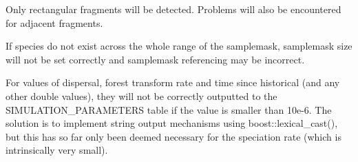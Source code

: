 
\begin{DoxyRefList}
\item[\label{bug__bug000002}%
\hypertarget{bug__bug000002}{}%
Member \hyperlink{class_community_ac9433a0c34911ec1128b5459f61488fc}{Community\+:\+:calc\+Fragments} (string fragment\+\_\+file)]Only rectangular fragments will be detected. Problems will also be encountered for adjacent fragments.  
\item[\label{bug__bug000001}%
\hypertarget{bug__bug000001}{}%
Member \hyperlink{class_community_a579c5f423fc2461838a80baf6b396310}{Community\+:\+:detect\+Dimensions} (string db)]If species do not exist across the whole range of the samplemask, samplemask size will not be set correctly and samplemask referencing may be incorrect.  
\item[\label{bug__bug000003}%
\hypertarget{bug__bug000003}{}%
Member \hyperlink{class_spatial_tree_ae97336318c81e182e9f445f7efdbff8d}{Spatial\+Tree\+:\+:setup} () override]For values of dispersal, forest transform rate and time since historical (and any other double values), they will not be correctly outputted to the S\+I\+M\+U\+L\+A\+T\+I\+O\+N\+\_\+\+P\+A\+R\+A\+M\+E\+T\+E\+RS table if the value is smaller than 10e-\/6. The solution is to implement string output mechanisms using boost\+::lexical\+\_\+cast(), but this has so far only been deemed necessary for the speciation rate (which is intrinsically very small).
\end{DoxyRefList}